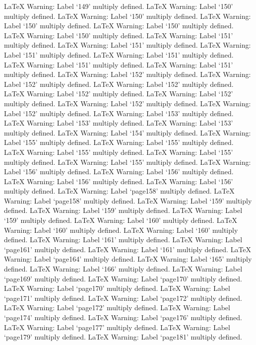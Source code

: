 LaTeX Warning: Label `149' multiply defined.
LaTeX Warning: Label `150' multiply defined.
LaTeX Warning: Label `150' multiply defined.
LaTeX Warning: Label `150' multiply defined.
LaTeX Warning: Label `150' multiply defined.
LaTeX Warning: Label `150' multiply defined.
LaTeX Warning: Label `151' multiply defined.
LaTeX Warning: Label `151' multiply defined.
LaTeX Warning: Label `151' multiply defined.
LaTeX Warning: Label `151' multiply defined.
LaTeX Warning: Label `151' multiply defined.
LaTeX Warning: Label `151' multiply defined.
LaTeX Warning: Label `152' multiply defined.
LaTeX Warning: Label `152' multiply defined.
LaTeX Warning: Label `152' multiply defined.
LaTeX Warning: Label `152' multiply defined.
LaTeX Warning: Label `152' multiply defined.
LaTeX Warning: Label `152' multiply defined.
LaTeX Warning: Label `152' multiply defined.
LaTeX Warning: Label `153' multiply defined.
LaTeX Warning: Label `153' multiply defined.
LaTeX Warning: Label `153' multiply defined.
LaTeX Warning: Label `154' multiply defined.
LaTeX Warning: Label `155' multiply defined.
LaTeX Warning: Label `155' multiply defined.
LaTeX Warning: Label `155' multiply defined.
LaTeX Warning: Label `155' multiply defined.
LaTeX Warning: Label `155' multiply defined.
LaTeX Warning: Label `156' multiply defined.
LaTeX Warning: Label `156' multiply defined.
LaTeX Warning: Label `156' multiply defined.
LaTeX Warning: Label `156' multiply defined.
LaTeX Warning: Label `page158' multiply defined.
LaTeX Warning: Label `page158' multiply defined.
LaTeX Warning: Label `159' multiply defined.
LaTeX Warning: Label `159' multiply defined.
LaTeX Warning: Label `159' multiply defined.
LaTeX Warning: Label `160' multiply defined.
LaTeX Warning: Label `160' multiply defined.
LaTeX Warning: Label `160' multiply defined.
LaTeX Warning: Label `161' multiply defined.
LaTeX Warning: Label `page161' multiply defined.
LaTeX Warning: Label `161' multiply defined.
LaTeX Warning: Label `page164' multiply defined.
LaTeX Warning: Label `165' multiply defined.
LaTeX Warning: Label `166' multiply defined.
LaTeX Warning: Label `page169' multiply defined.
LaTeX Warning: Label `page170' multiply defined.
LaTeX Warning: Label `page170' multiply defined.
LaTeX Warning: Label `page171' multiply defined.
LaTeX Warning: Label `page172' multiply defined.
LaTeX Warning: Label `page172' multiply defined.
LaTeX Warning: Label `page174' multiply defined.
LaTeX Warning: Label `page176' multiply defined.
LaTeX Warning: Label `page177' multiply defined.
LaTeX Warning: Label `page179' multiply defined.
LaTeX Warning: Label `page181' multiply defined.
